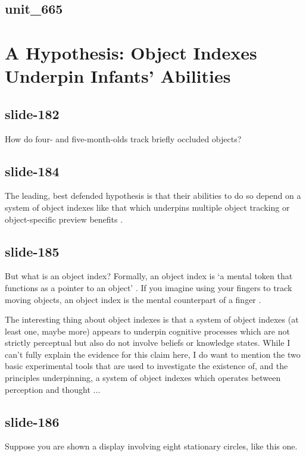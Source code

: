 \documentclass[12pt,\papersize]{extarticle}
\begin{document}
\subsection{unit\_665}


\section{A Hypothesis: Object Indexes Underpin Infants’ Abilities}

\subsection{slide-182}
How do four- and five-month-olds track briefly occluded objects?

\subsection{slide-184}
The leading, best defended hypothesis is that their abilities to do so
depend on a system of
object indexes like that which underpins multiple object tracking or
object-specific preview benefits
\citep{Leslie:1998zk,Scholl:1999mi,Carey:2001ue,scholl:2007_objecta}.

\subsection{slide-185}
But what is an object index?
Formally, an object index is ‘a mental token that functions as a
pointer to an object’ \citep[p.\ 11]{Leslie:1998zk}.
If you imagine using your fingers to track moving objects,
an object index is the mental counterpart of a finger \citep[p.~68]{pylyshyn:1989_role}.

The interesting thing about object indexes is that a system of object
indexes (at least one, maybe more)
appears to underpin cognitive processes which are not
strictly perceptual but also do not involve beliefs or knowledge states.
While I can’t fully explain the evidence for this claim here,
I do want to mention the two basic experimental tools that are used to
investigate the existence of, and the principles underpinning,
a system of object indexes which operates
between perception and thought ...

\subsection{slide-186}
Suppose you are shown a display involving eight stationary circles, like
this one.
\end{document}
